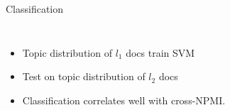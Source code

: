 \documentclass[compress]{beamer}
\begin{document}
		\begin{frame}{Classification}

                  \begin{columns}
			\begin{itemize}
				\item Topic distribution of $l_1$ docs
                                  train SVM
				\item Test on topic distribution of $l_2$ docs
				\item Classification correlates
                                  well with cross-NPMI.
			\end{itemize}
                    \end{columns}
		\end{frame}
\end{document}
